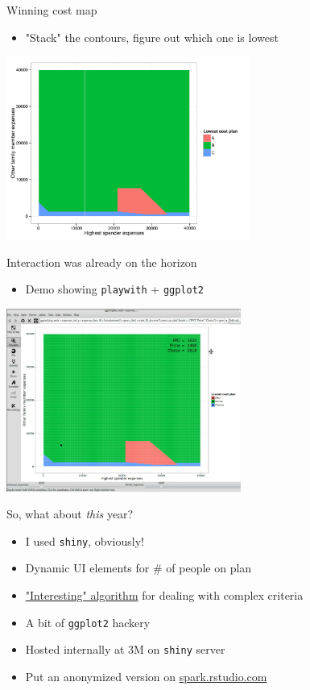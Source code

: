 \documentclass[sans,aspectratio=169,presentation,bigger,fleqn]{beamer}
\begin{document}
\begin{frame}[label=sec-18]{Winning cost map}
\begin{itemize}
\item "Stack" the contours, figure out which one is lowest
\end{itemize}

\begin{center}
\includegraphics[height=6cm]{./img/ins-cost-map.pdf}
\end{center}
\end{frame}
\begin{frame}[fragile,label=sec-19]{Interaction was already on the horizon}
 \begin{itemize}
\item Demo showing \texttt{playwith} + \texttt{ggplot2}
\end{itemize}

\begin{center}
\includegraphics[height=6cm]{./img/ins-playwith.png}
\end{center}
\end{frame}
\begin{frame}[fragile,label=sec-20]{So, what about \emph{this} year?}
 \begin{itemize}
\item I used \texttt{shiny}, obviously!
\item Dynamic UI elements for \# of people on plan
\item \href{http://stackoverflow.com/questions/18116967/dealing-with-conditionals-in-a-better-manner-than-deeply-nested-ifelse-blocks}{"Interesting" algorithm} for dealing with complex criteria
\item A bit of \texttt{ggplot2} hackery
\item Hosted internally at 3M on \texttt{shiny} server
\item Put an anonymized version on \href{http://spark.rstudio.com/jwhendy/insurance-visualizer}{spark.rstudio.com}
\end{itemize}
\end{frame}
\end{document}
